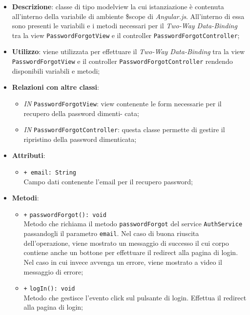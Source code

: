 	\begin{itemize}
		\item \textbf{Descrizione}: classe di tipo modelview la cui istanziazione è contenuta all'interno della variabile di ambiente \$scope di \textit{Angular.js}. All'interno di essa sono presenti le variabili e i metodi necessari per il \textit{Two-Way Data-Binding} tra la view \texttt{PasswordForgotView} e il controller \texttt{PasswordForgotController};
		\item \textbf{Utilizzo}: viene utilizzata per effettuare il \textit{Two-Way Data-Binding} tra la view \texttt{PasswordForgotView} e il controller \texttt{PasswordForgotController} rendendo disponibili variabili e metodi;
		\item \textbf{Relazioni con altre classi}: 
		\begin{itemize}
			\item \textit{IN} \texttt{PasswordForgotView}: view contenente le form necessarie per il recupero della password dimenti- cata; 
			\item \textit{IN} \texttt{PasswordForgotController}: questa classe permette di gestire il ripristino della password dimenticata;
		\end{itemize}
		\item \textbf{Attributi}: 
		\begin{itemize}
			\item \texttt{+ email: String} \\ Campo dati contenente l'email per il recupero password;
		\end{itemize}
		\item \textbf{Metodi}: 
		\begin{itemize}
			\item \texttt{+} \texttt{passwordForgot(): void} \\
			Metodo che richiama il metodo \texttt{passwordForgot} del service \texttt{AuthService} passandogli il parametro \texttt{email}. Nel caso di buona riuscita dell'operazione, viene mostrato un messaggio di successo il cui corpo contiene anche un bottone per effettuare il redirect alla pagina di login. Nel caso in cui invece avvenga un errore, viene mostrato a video il messaggio di errore;
			\item \texttt{+} \texttt{logIn(): void} \\
			Metodo che gestisce l’evento click sul pulsante di login. Effettua il redirect alla pagina di login;
		\end{itemize}
	\end{itemize}
	
	